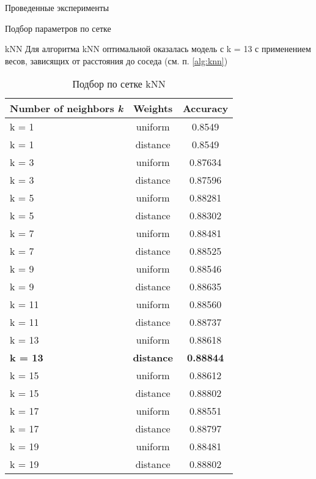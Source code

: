 

\begin{section}{Проведенные эксперименты}

\begin{subsection}{Подбор параметров по сетке}
\begin{subsubsection}{kNN}
  Для алгоритма kNN оптимальной оказалась модель с k = 13 с применением весов, зависящих от расстояния до соседа (см. п. \ref{alg:knn})

  \begin{table}[H]
  \centering
  {\begin{tabular}{|l|c|c|}
  \hline
  \textbf{Number of neighbors \textit{k}} & \textbf{Weights} & \textbf{Accuracy} \\
  \hline
  k = 1 & uniform  & 0.8549 \\
  \hline
  k = 1 & distance  & 0.8549 \\
  \hline
  k = 3 & uniform  & 0.87634 \\
  \hline
  k = 3 &  distance & 0.87596  \\
  \hline
  k = 5 & uniform  & 0.88281 \\
  \hline
  k = 5 & distance  & 0.88302 \\
  \hline
  k = 7 & uniform  & 0.88481 \\
  \hline
  k = 7 &  distance & 0.88525  \\
  \hline
  k = 9 & uniform  & 0.88546 \\
  \hline
  k = 9 & distance  & 0.88635 \\
  \hline
  k = 11 & uniform  & 0.88560 \\
  \hline
  k = 11 &  distance & 0.88737  \\
  \hline
  k = 13 & uniform  & 0.88618 \\
  \hline
  \textbf{k = 13} & \textbf{distance}  & \textbf{0.88844} \\
  \hline
  k = 15 & uniform  & 0.88612 \\
  \hline
  k = 15 &  distance & 0.88802  \\
  \hline
  k = 17 & uniform  & 0.88551 \\
  \hline
  k = 17 & distance  & 0.88797 \\
  \hline
  k = 19 & uniform  & 0.88481 \\
  \hline
  k = 19 &  distance & 0.88802  \\
  \hline
  \end{tabular}}

  \caption{Подбор по сетке kNN}
  \label{grid:knn}
  \end{table}




\end{subsubsection}
\end{subsection}
\end{section}

